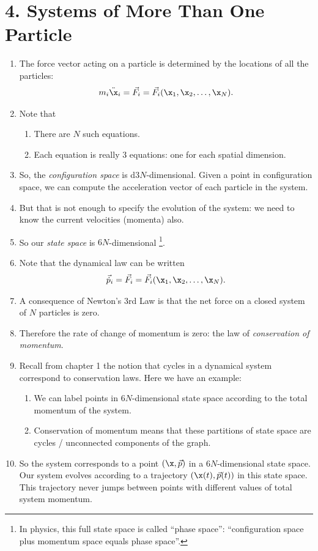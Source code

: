 \section{4.    Systems of  More Than One Particle}
\begin{enumerate}
\item The force vector acting on a particle is determined by the locations of all the particles:
  \begin{align*}
    m_i\ddot{\x}_i = \vec{F_i} = \vec{F_i}(\x_1, \x_2, \ldots, \x_N).
  \end{align*}
\item Note that
  \begin{enumerate}
  \item There are $N$ such equations.
  \item Each equation is really 3 equations: one for each spatial dimension.
  \end{enumerate}
\item So, the {\it configuration space} is d$3N$-dimensional. Given a point in configuration space, we can compute the acceleration
  vector of each particle in the system.
\item But that is not enough to specify the evolution of the system: we need to know the current velocities (momenta)
  also.
\item So our {\it state space} is $6N$-dimensional \footnote{In physics, this full state space is called ``phase space'': ``configuration space plus momentum space
    equals phase space''.}.
\item Note that the dynamical law can be written
  \begin{align*}
    \vec{\dot{p}}_i = \vec{F_i} = \vec{F_i}(\x_1, \x_2, \ldots, \x_N).
  \end{align*}
\item A consequence of Newton's 3rd Law is that the net force on a closed system of  $N$ particles is zero.
\item Therefore the rate of change of momentum is zero: the law of \emph{conservation of momentum}.
\item Recall from chapter 1 the notion that cycles in a dynamical system correspond to conservation laws. Here we have
  an example:
  \begin{enumerate}
  \item We can label points in $6N$-dimensional state space according to the total momentum of the system.
  \item Conservation of momentum means that these partitions of state space are cycles / unconnected components of the
    graph.
  \end{enumerate}
\item So the system corresponds to a point $(\x, \vec{p})$ in a $6N$-dimensional state space. Our system evolves according
  to a trajectory $(\x(t), \vec{p}(t))$ in this state space. This trajectory never jumps between points
  with different values of total system momentum.

\end{enumerate}

